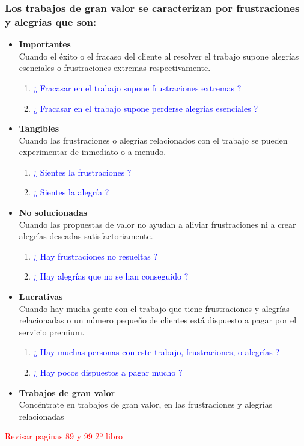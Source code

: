 \documentclass[11pt]{book}
\begin{document}
\subsubsection{Los trabajos de gran valor se caracterizan por frustraciones y alegrías que son:}
\begin{itemize}
\item \textbf{ Importantes }\\
Cuando el éxito o el fracaso del cliente al resolver el trabajo supone alegrías esenciales o frustraciones extremas respectivamente.
\begin{enumerate}
\item \textcolor{blue}{¿ Fracasar en el trabajo supone frustraciones extremas ?}
\item \textcolor{blue}{¿ Fracasar en el trabajo supone perderse alegrías esenciales ?}
\end{enumerate}
\item \textbf{ Tangibles }\\
Cuando las frustraciones o alegrías relacionados con el trabajo se pueden experimentar de inmediato o a menudo.
\begin{enumerate}
\item \textcolor{blue}{¿ Sientes la frustraciones ?}
\item \textcolor{blue}{¿ Sientes la alegría ?}
\end{enumerate}
\item \textbf{ No solucionadas }\\
Cuando las propuestas de valor no ayudan a aliviar frustraciones ni a crear alegrías deseadas satisfactoriamente.
\begin{enumerate}
\item \textcolor{blue}{¿ Hay frustraciones no resueltas ?}
\item \textcolor{blue}{¿ Hay alegrías que no se han conseguido ?}
\end{enumerate}
\item \textbf{ Lucrativas }\\
Cuando hay mucha gente con el trabajo que tiene frustraciones y alegrías relacionadas o un número pequeño de clientes está dispuesto a pagar por el servicio premium.
\begin{enumerate}
\item \textcolor{blue}{¿ Hay muchas personas con este trabajo, frustraciones, o alegrías ?}
\item \textcolor{blue}{¿ Hay pocos dispuestos a pagar mucho ?}
\end{enumerate}
\item \textbf{ Trabajos de gran valor }\\
Concéntrate en trabajos de gran valor, en las frustraciones y alegrías relacionadas
\end{itemize}
\textcolor{red}{Revisar paginas 89 y 99 2º libro}
\end{document}
